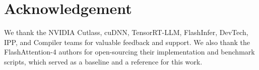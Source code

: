 \section*{Acknowledgement}
We thank the NVIDIA Cutlass, cuDNN, TensorRT-LLM, FlashInfer, DevTech, IPP, and Compiler teams for valuable feedback and support.
We also thank the FlashAttention-4 authors for open-sourcing their implementation and benchmark scripts, which served as a baseline and a reference for this work.
